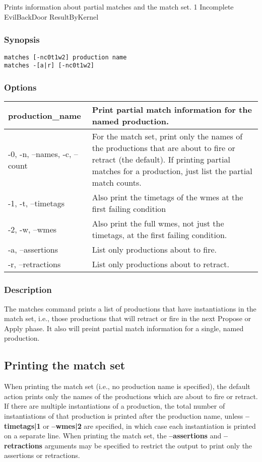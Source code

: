 \subsection{}
\label{matches}
Prints information about partial matches and the match set. 
 1 Incomplete EvilBackDoor ResultByKernel
\subsubsection*{Synopsis}
\begin{verbatim}
matches [-nc0t1w2] production name
matches -[a|r] [-nc0t1w2]
\end{verbatim}
\subsubsection*{Options}
\begin{tabular}{|l|l|}
\hline 
production\_name & Print partial match information for the named production.  \\
 \hline 
 -0, -n, --names, -c, --count  & For the match set, print only the names of the productions that are about to fire or retract (the default). If printing partial matches for a production, just list the partial match counts.  \\
 \hline 
 -1, -t, --timetags  & Also print the timetags of the wmes at the first failing condition  \\
 \hline 
 -2, -w, --wmes  & Also print the full wmes, not just the timetags, at the first failing condition.  \\
 \hline 
 -a, --assertions  & List only productions about to fire.  \\
 \hline 
 -r, --retractions  & List only productions about to retract.  \\
 \hline 
\end{tabular}
\subsubsection*{Description}
 The matches command prints a list of productions that have instantiations in the match set, i.e., those productions that will retract or fire in the next Propose or Apply phase. It also will preint partial match information for a single, named production. 
\subsection*{Printing the match set}
 When printing the match set (i.e., no production name is specified), the default action prints only the names of the productions which are about to fire or retract. If there are multiple instantiations of a production, the total number of instantiations of that production is printed after the production name, unless \textbf{--timetags|1}
 or \textbf{--wmes|2}
 are specified, in which case each instantiation is printed on a separate line. 
 When printing the match set, the \textbf{--assertions}
 and \textbf{--retractions}
 arguments may be specified to restrict the output to print only the assertions or retractions. 
